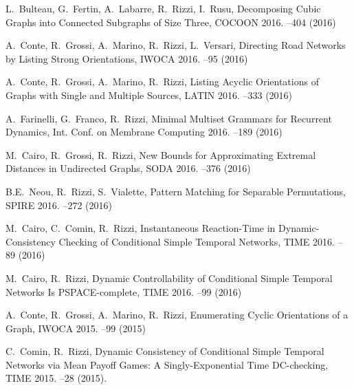 \begin{etaremune}
  \item {\sc L.~Bulteau, G.~Fertin, A.~Labarre, R.~Rizzi, I.~Rusu},
   \newblock Decomposing Cubic Graphs into Connected Subgraphs of Size Three,
   \newblock COCOON 2016.
   --404 (2016)

  \item {\sc A.~Conte, R.~Grossi, A.~Marino, R.~Rizzi, L.~Versari},
   \newblock Directing Road Networks by Listing Strong Orientations,
   \newblock IWOCA 2016.
   --95 (2016)

  \item {\sc A.~Conte, R.~Grossi, A.~Marino, R.~Rizzi},
   \newblock Listing Acyclic Orientations of Graphs with Single and Multiple Sources,
   \newblock LATIN 2016.
   --333 (2016)

  \item {\sc A.~Farinelli, G.~Franco, R.~Rizzi},
   \newblock Minimal Multiset Grammars for Recurrent Dynamics,
   \newblock Int. Conf. on Membrane Computing 2016.
   --189 (2016)

  \item {\sc M.~Cairo, R.~Grossi, R.~Rizzi},
   \newblock New Bounds for Approximating Extremal Distances in Undirected Graphs,
   \newblock SODA 2016.
   --376 (2016)

  \item {\sc B.E.~Neou, R.~Rizzi, S.~Vialette},
   \newblock Pattern Matching for Separable Permutations,
   \newblock SPIRE 2016.
   --272 (2016)

  \item {\sc M.~Cairo, C.~Comin, R.~Rizzi},
   \newblock Instantaneous Reaction-Time in Dynamic-Consistency Checking of Conditional Simple Temporal Networks,
   \newblock TIME 2016.
   --89 (2016)

  \item {\sc M.~Cairo, R.~Rizzi},
   \newblock Dynamic Controllability of Conditional Simple Temporal Networks Is PSPACE-complete,
   \newblock TIME 2016.
   --99 (2016)

  \item {\sc A.~Conte, R.~Grossi, A.~Marino, R.~Rizzi},
   \newblock Enumerating Cyclic Orientations of a Graph,
   \newblock IWOCA 2015.
   --99 (2015)

  \item {\sc C.~Comin, R.~Rizzi},
   \newblock Dynamic Consistency of Conditional Simple Temporal Networks via Mean Payoff Games: A Singly-Exponential Time DC-checking,
   \newblock TIME 2015.
   --28 (2015).


\end{etaremune}
